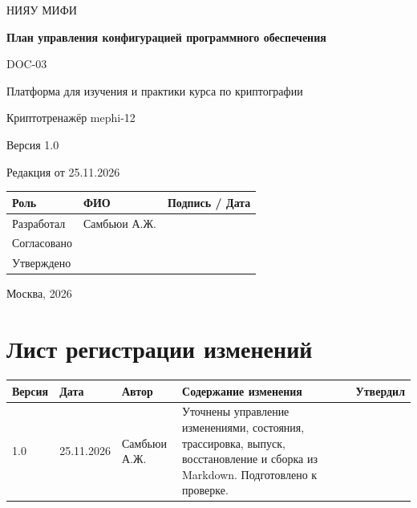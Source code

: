 \documentclass[12pt,a4paper]{article}
\begin{document}
\hypersetup{pageanchor=false}
\begin{titlepage}
  \thispagestyle{empty}
  \centering
  {\large НИЯУ МИФИ\par}
  \vspace*{3.5cm}
  {\LARGE\bfseries План управления конфигурацией программного обеспечения\par}
  \vspace{0.5cm}
  {\large DOC-03\par}
  \vspace{0.6cm}
  {\large Платформа для изучения и практики курса по криптографии\par}
  {\large Криптотренажёр mephi-12\par}
  \vspace{0.7cm}
  {\large Версия 1.0\par}
  {\large Редакция от 25.11.2026\par}
  \vspace{1cm}
  \begin{tabularx}{\textwidth}{@{}p{3.4cm}Xp{4cm}@{}}
    \toprule
    Роль & ФИО & Подпись / Дата \\
    \midrule
    Разработал & Самбьюи А.Ж. & \\
    \addlinespace[6pt]
    Согласовано & & \\
    \addlinespace[6pt]
    Утверждено & & \\
    \bottomrule
  \end{tabularx}
  \vfill
  {\large Москва, 2026\par}
\end{titlepage}
\hypersetup{pageanchor=true}

\section*{Лист регистрации изменений}
\begingroup\small\singlespacing
\noindent
\begin{tabularx}{\textwidth}{@{}p{1.2cm}p{2cm}p{2.5cm}Xp{1.8cm}@{}}
\toprule
Версия & Дата & Автор & Содержание изменения & Утвердил \\
\midrule
1.0 & 25.11.2026 & Самбьюи А.Ж. & Уточнены управление изменениями, состояния, трассировка, выпуск, восстановление и сборка из Markdown. Подготовлено к проверке. & \\
\bottomrule
\end{tabularx}
\endgroup
\clearpage
\begingroup\small\singlespacing
\tableofcontents
\endgroup
\clearpage
\end{document}
